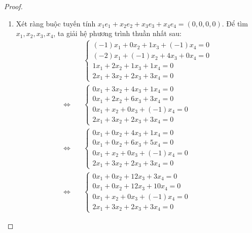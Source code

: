 \documentclass[class=linearalgebra,crop=false]{standalone}
\begin{document}
\begin{proof}
    \begin{enumerate}[label = (\alph*)]
        \item Xét ràng buộc tuyến tính $x_{1}e_{1} + x_{2}e_{2} + x_{3}e_{3} + x_{4}e_{4} = (0,0,0,0)$. Để tìm $x_{1}, x_{2}, x_{3}, x_{4}$, ta giải hệ phương trình thuần nhất sau:
            \begin{align*}
                &\begin{cases}
                    (-1)x_{1} + 0x_{2} + 1x_{3} + (-1)x_{4} = 0 \\
                    (-2)x_{1} + (-1)x_{2} + 4x_{3} + 0x_{4} = 0 \\
                    1x_{1} + 2x_{2} + 1x_{3} + 1x_{4} = 0 \\
                    2x_{1} + 3x_{2} + 2x_{3} + 3x_{4} = 0
                \end{cases} \\
                \Leftrightarrow\quad&
                \begin{cases}
                    0x_{1} + 3x_{2} + 4x_{3} + 1x_{4} = 0 \\
                    0x_{1} + 2x_{2} + 6x_{3} + 3x_{4} = 0 \\
                    0x_{1} + x_{2} + 0x_{3} + (-1)x_{4} = 0 \\
                    2x_{1} + 3x_{2} + 2x_{3} + 3x_{4} = 0
                \end{cases} \\
                \Leftrightarrow\quad&
                \begin{cases}
                    0x_{1} + 0x_{2} + 4x_{3} + 1x_{4} = 0 \\
                    0x_{1} + 0x_{2} + 6x_{3} + 5x_{4} = 0 \\
                    0x_{1} + x_{2} + 0x_{3} + (-1)x_{4} = 0 \\
                    2x_{1} + 3x_{2} + 2x_{3} + 3x_{4} = 0
                \end{cases} \\
                \Leftrightarrow\quad&
                \begin{cases}
                    0x_{1} + 0x_{2} + 12x_{3} + 3x_{4} = 0 \\
                    0x_{1} + 0x_{2} + 12x_{3} + 10x_{4} = 0 \\
                    0x_{1} + x_{2} + 0x_{3} + (-1)x_{4} = 0 \\
                    2x_{1} + 3x_{2} + 2x_{3} + 3x_{4} = 0

\end{cases}
\end{align*}
\end{enumerate}
\end{proof}
\end{document}
